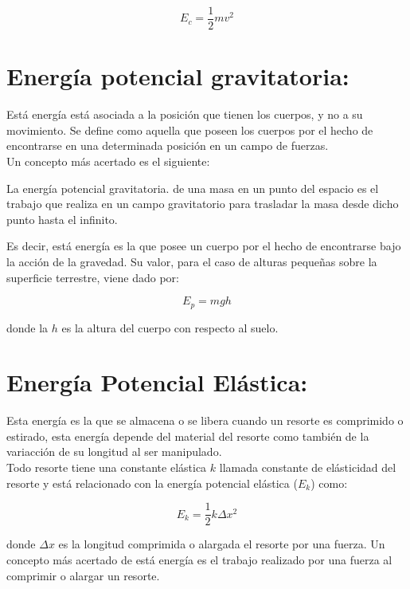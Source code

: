 \documentclass[a5paper,pagesize,10pt,bibtotoc,pointlessnumbers,
normalheadings,DIV=9,fleqn,x11names,table,twoside=false]{scrbook}
\begin{document}
\begin{equation}
E_c = \frac{1}{2}mv^2
\end{equation}

\section{Energía potencial gravitatoria:}

Está energía está asociada a la posición que tienen los cuerpos, y no a su movimiento. Se define como aquella que poseen los 
cuerpos por el hecho de encontrarse en una determinada posición en un campo de fuerzas.\\

Un concepto más acertado es el siguiente:

\begin{tcolorbox}
La energía potencial gravitatoria. de una masa en un punto del espacio es el trabajo que realiza en un campo gravitatorio para 
trasladar la masa desde dicho punto hasta el infinito. 
\end{tcolorbox}

Es decir, está energía es la que posee un cuerpo por el hecho de encontrarse bajo la acción de la gravedad. Su valor, para el caso 
de alturas pequeñas sobre la superficie terrestre, viene dado por:

\begin{equation}
E_p = mgh
\end{equation}

donde la $h$ es la altura del cuerpo con respecto al suelo.

\section{Energía Potencial Elástica:}

Esta energía es la que se almacena o se libera cuando un resorte es comprimido o estirado, esta energía depende del material del 
resorte como también de la variacción de su longitud al ser manipulado.\\

Todo resorte tiene una constante elástica $k$ llamada constante de elásticidad del resorte y está relacionado con la energía 
potencial elástica ($E_k$) como:

\begin{equation}
E_k = \frac{1}{2}k\Delta x^2
\end{equation}

donde $\Delta x$ es la longitud comprimida o alargada el resorte por una fuerza. Un concepto más acertado de está energía es el 
trabajo realizado por una fuerza al comprimir o alargar un resorte.
\end{document}
